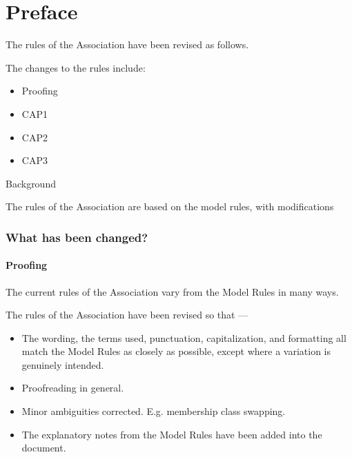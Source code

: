 \documentclass[../constitution.tex]{subfiles}
\begin{document}
\part*{Preface}


The rules of the Association have been revised as follows.

The changes to the rules include:

\begin{itemize}
    \item Proofing
    \item CAP1
    \item CAP2
    \item CAP3
\end{itemize}

Background

The rules of the Association are based on the model rules, with modifications 


\section*{What has been changed?}

\subsection*{Proofing}

The current rules of the Association vary from the Model Rules in many ways.




The rules of the Association have been revised so that ---

\begin{itemize}
    \item The wording, the terms used, punctuation, capitalization, and formatting all match the Model Rules as closely as possible, except where a variation is genuinely intended.
    \item Proofreading in general.
    \item Minor ambiguities corrected. E.g. membership class swapping.
    \item The explanatory notes from the Model Rules have been added into the document.
\end{itemize}
\end{document}

